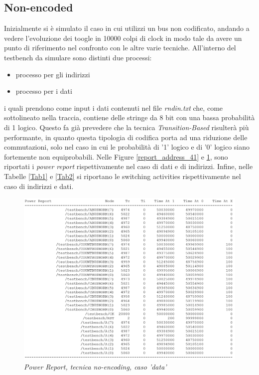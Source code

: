 \subsection{Non-encoded}
Inizialmente si è simulato il caso in cui utilizzi un bus non codificato, andando a vedere l'evoluzione dei toogle in 10000 colpi di clock in modo tale da avere un punto di riferimento nel confronto con le altre varie tecniche. All'interno del testbench da simulare sono distinti due processi:
\begin{itemize}
	\item processo per gli indirizzi
	\item processo per i dati
\end{itemize}
i quali prendono come input i dati contenuti nel file \textit{rndin.txt} che, come sottolineato nella traccia, contiene delle stringe da 8 bit con una bassa probabilità di 1 logico. Questo fa già prevedere che la tecnica \textit{Transition-Based} risulterà più performante, in quanto questa tipologia di codifica porta ad una riduzione delle commutazioni, solo nel caso in cui le probabilità di '1' logico e di '0' logico siano fortemente non equiprobabili.
Nelle Figure \ref{report_address_41} e \ref{report_dati_41}, sono riportati i \textit{power report} rispettivamente nel caso di dati e di indirizzi. Infine, nelle Tabelle \ref{Tab1} e \ref{Tab2} si riportano le switching activities rispettivamente nel caso di indirizzi e dati.
\begin{figure}[!htb]
	\centering
	\includegraphics[scale=0.65]{immagini/4_1_data_report}
	\caption{\textit{Power Report, tecnica no-encoding, caso 'data'}}
	\label{report_dati_41}
\end{figure}
